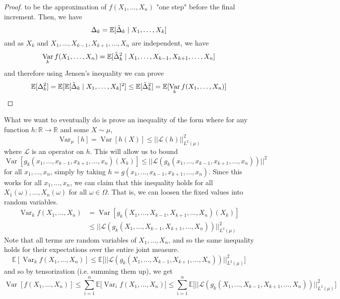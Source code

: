 \documentclass{article}
\DeclareMathOperator{\Var}{Var}
\theoremstyle{definition}
\theoremstyle{remark}
\theoremstyle{definition}
\begin{document}
\begin{proof}
to be the approximation of $f(X_1, \ldots, X_n)$ "one step" before the final increment. Then, we have 
\[\Delta_k = \mathbb{E}[\Tilde{\Delta}_k \mid X_1, \ldots, X_k]\]
and as $X_k$ and $X_1, \ldots, X_{k-1}, X_{k+1}, \ldots, X_n$ are independent, we have 
\[\Var_k f(X_1, \ldots, X_n) = \mathbb{E}[\Tilde{\Delta}_k^2 \mid X_1, \ldots, X_{k-1}, X_{k+1}, \ldots, X_n] \]
and therefore using Jensen's inequality we can prove 
\[\mathbb{E}[\Delta_k^2] = \mathbb{E}[\mathbb{E}[ \Tilde{\Delta}_k \mid X_1, \ldots, X_k]^2 ] \leq \mathbb{E}[\Tilde{\Delta}_k^2] = \mathbb{E}[\Var_k f(X_1, \ldots, X_n)]\]
\end{proof}

What we want to eventually do is prove an inequality of the form where for any function $h: \mathbb{R} \rightarrow \mathbb{R}$ and some $X \sim \mu$, 
\[\Var_\mu[h] = \Var [h(X)] \leq ||\mathcal{L}(h)||^2_{L^2 (\mu)}\]
where $\mathcal{L}$ is an operator on $h$. This will allow us to bound 
\[\Var [g_k (x_1, \ldots, x_{k-1}, x_{k+1}, \ldots, x_n)(X_k)] \leq ||\mathcal{L}(g_k (x_1, \ldots, x_{k-1}, x_{k+1}, \ldots, x_n))||^2\]
for all $x_1, \ldots, x_n$, simply by taking $h = g(x_1, \ldots, x_{k-1}, x_{k+1}, \ldots, x_n)$. Since this works for all $x_1, \ldots, x_n$, we can claim that this inequality holds for all $X_1 (\omega), \ldots, X_n (\omega)$ for all $\omega \in \Omega$. That is, we can loosen the fixed values into random variables. 
\begin{align*}
    \Var_{k} f(X_1, \ldots, X_n) & = \Var[g_k (X_1, \ldots, X_{k-1}, X_{k+1}, \ldots, X_n)(X_k)] \\
    & \leq || \mathcal{L}(g_k (X_1, \ldots, X_{k-1}, X_{k+1}, \ldots, X_n))||^2_{L^2 (\mu)} 
\end{align*}
Note that all terms are random variables of $X_1, \ldots, X_n$, and so the same inequality holds for their expectations over the entire joint measure. 
\[\mathbb{E}[ \Var_{k} f(X_1, \ldots, X_n) ] \leq \mathbb{E} \big[ || \mathcal{L}(g_k (X_1, \ldots, X_{k-1}, X_{k+1}, \ldots, X_n))||^2_{L^2 (\mu)} \big] \]
and so by tensorization (i.e. summing them up), we get 
\[\Var[f(X_1, \ldots, X_n)] \leq \sum_{i=1}^n \mathbb{E} \big[ \Var_i f(X_1, \ldots, X_n) \big] \leq \sum_{i=1}^n \mathbb{E} \big[ || \mathcal{L}(g_k (X_1, \ldots, X_{k-1}, X_{k+1}, \ldots, X_n))||^2_{L^2 (\mu)} \big] \]
\end{document}
